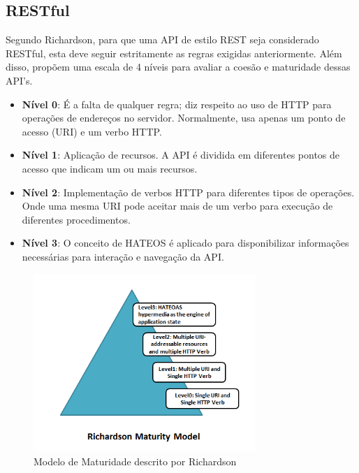 \subsection[RESTful]{RESTful}

Segundo Richardson, para que uma API de estilo REST seja considerado RESTful, esta deve seguir estritamente as regras exigidas anteriormente. Além disso, propõem uma escala de 4 níveis para avaliar a coesão e maturidade dessas API's. \cite{RichardsonEtAl2013}

\begin{itemize}[noitemsep]
\item \textbf{Nível 0}: É a falta de qualquer regra; diz respeito ao uso de HTTP para operações de endereços no servidor. Normalmente, usa apenas um ponto de acesso (URI) e um verbo HTTP.
\item \textbf{Nível 1}: Aplicação de recursos. A API é dividida em diferentes pontos de acesso que indicam um ou mais recursos.
\item \textbf{Nível 2}: Implementação de verbos HTTP para diferentes tipos de operações. Onde uma mesma URI pode aceitar mais de um verbo para execução de diferentes procedimentos.
\item \textbf{Nível 3}: O conceito de HATEOS é aplicado para disponibilizar informações necessárias para interação e navegação da API.
\end{itemize}

\begin{figure}[H]
  \centering
  \includegraphics[width=0.75\textwidth,height=\textheight,keepaspectratio]{figuras/richardson-maturity-model.png}
  \caption{Modelo de Maturidade descrito por Richardson}
\end{figure}
